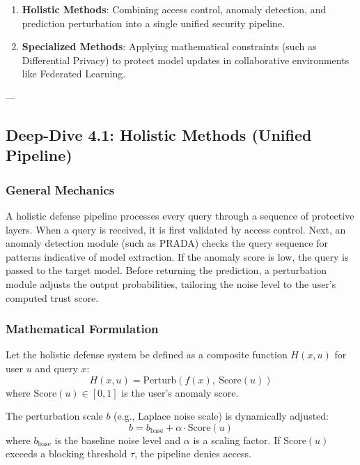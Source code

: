 \documentclass{article}
\begin{document}
\begin{enumerate}
    \item \textbf{Holistic Methods}: Combining access control, anomaly detection, and prediction perturbation into a single unified security pipeline.
    \item \textbf{Specialized Methods}: Applying mathematical constraints (such as Differential Privacy) to protect model updates in collaborative environments like Federated Learning.
\end{enumerate}

---

\subsection{Deep-Dive 4.1: Holistic Methods (Unified Pipeline)}

\subsubsection{General Mechanics}
A holistic defense pipeline processes every query through a sequence of protective layers. When a query is received, it is first validated by access control. Next, an anomaly detection module (such as PRADA) checks the query sequence for patterns indicative of model extraction. If the anomaly score is low, the query is passed to the target model. Before returning the prediction, a perturbation module adjusts the output probabilities, tailoring the noise level to the user's computed trust score.

\subsubsection{Mathematical Formulation}
Let the holistic defense system be defined as a composite function $H(x, u)$ for user $u$ and query $x$:
\begin{equation}
    H(x, u) = \text{Perturb}\left( f(x), \ \text{Score}(u) \right)
\end{equation}
where $\text{Score}(u) \in [0, 1]$ is the user's anomaly score. 

The perturbation scale $b$ (e.g., Laplace noise scale) is dynamically adjusted:
\begin{equation}
    b = b_{\text{base}} + \alpha \cdot \text{Score}(u)
\end{equation}
where $b_{\text{base}}$ is the baseline noise level and $\alpha$ is a scaling factor. If $\text{Score}(u)$ exceeds a blocking threshold $\tau$, the pipeline denies access.
\end{document}
